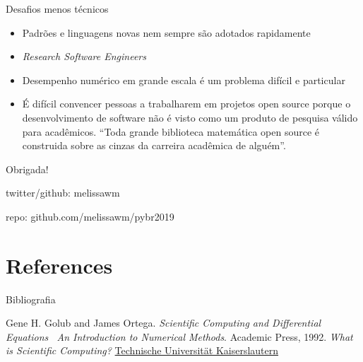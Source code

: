 \documentclass{beamer}
\begin{document}
\begin{darkframes}
  \begin{frame}{Desafios menos técnicos}
    \begin{itemize}
    \item<1-> Padrões e linguagens novas nem sempre são adotados rapidamente
    \item<2-> \emph{Research Software Engineers}%
    \item<3-> Desempenho numérico em grande escala é um problema difícil e particular %
    \item<4-> É difícil convencer pessoas a trabalharem em projetos open source porque o desenvolvimento de software não é visto como um produto de pesquisa válido para acadêmicos. ``Toda grande biblioteca matemática open source é construida sobre as cinzas da carreira acadêmica de alguém''.
    \end{itemize}
  \end{frame}

  \begin{frame}

    \begin{center}
      \begin{Huge}
        Obrigada!
      \end{Huge}
    \end{center}

    \vfill

    \begin{center}
      twitter/github: melissawm

      repo: github.com/melissawm/pybr2019
    \end{center}
    
  \end{frame}
  
  \section{References}
  \begin{frame}[label=bibliography, allowframebreaks]{Bibliografia}
    \scriptsize{%
    \begin{thebibliography}{99}
      Gene H. Golub and James Ortega. \emph{Scientific Computing and Differential Equations \textemdash\ An Introduction to Numerical Methods}. Academic Press, 1992.
     \emph{What is Scientific Computing?} \href{https://www.scicomp.uni-kl.de/about/scientific-computing/}{Technische Universität Kaiserslautern}
      

\end{thebibliography}}
\end{frame}
\end{darkframes}
\end{document}
